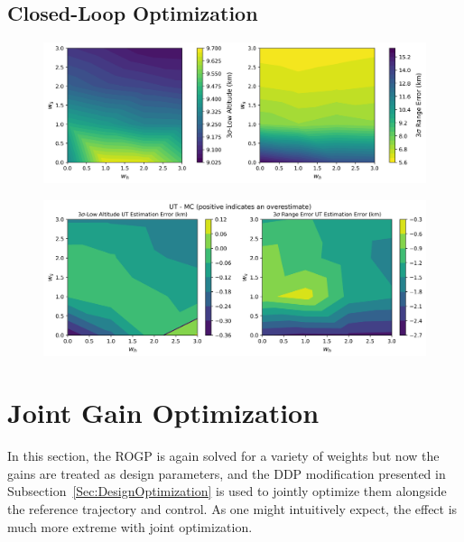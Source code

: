 \subsection{Closed-Loop Optimization}
\begin{figure}[h!]
	\centering
	\includegraphics[width=1\textwidth]{Images/Reestimated_WeightSweepMCResults}
	\caption{}
	\label{Fig:MCResultsFixedGain}
\end{figure}
\begin{figure}[h!]
	\centering
	\includegraphics[width=1\textwidth]{Images/Reestimated_WeightSweepError}
	\caption{}
	\label{Fig:MCErrorsFixedGain}
\end{figure}


\section{Joint Gain Optimization}

In this section, the ROGP is again solved for a variety of weights but now the gains are treated as design parameters, and the DDP modification presented in Subsection~\ref{Sec:DesignOptimization} is used to jointly optimize them alongside the reference trajectory and control. As one might intuitively expect, the effect is much more extreme with joint optimization. 

